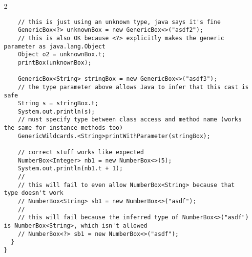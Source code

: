 \documentclass{article}
\def \columncount {2}
\begin{document}
\begin{multicols}{\columncount}
\begin{outline}[longenum]
\begin{verbatim}
    // this is just using an unknown type, java says it's fine
    GenericBox<?> unknownBox = new GenericBox<>("asdf2");
    // this is also OK because <?> explicitly makes the generic parameter as java.lang.Object
    Object o2 = unknownBox.t;
    printBox(unknownBox);

    GenericBox<String> stringBox = new GenericBox<>("asdf3");
    // the type parameter above allows Java to infer that this cast is safe
    String s = stringBox.t;
    System.out.println(s);
    // must specify type between class access and method name (works the same for instance methods too)
    GenericWildcards.<String>printWithParameter(stringBox);

    // correct stuff works like expected
    NumberBox<Integer> nb1 = new NumberBox<>(5);
    System.out.println(nb1.t + 1);
    //
    // this will fail to even allow NumberBox<String> because that type doesn't work
    // NumberBox<String> sb1 = new NumberBox<>("asdf");
    // 
    // this will fail because the inferred type of NumberBox<>("asdf") is NumberBox<String>, which isn't allowed
    // NumberBox<?> sb1 = new NumberBox<>("asdf");
  }
}
\end{verbatim}



\end{outline}
\end{multicols}
\end{document}
